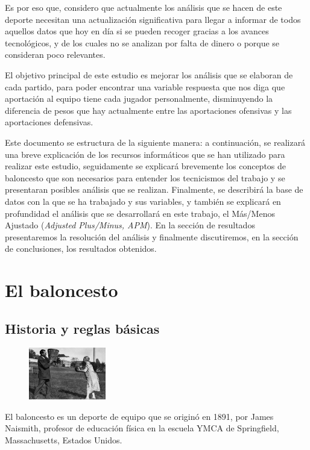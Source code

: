\documentclass[paper=a4, fontsize=9pt]{article}
\begin{document}
Es por eso que, considero que actualmente los análisis que se hacen de este deporte necesitan una actualización significativa para llegar a informar de todos aquellos datos que hoy en día si se pueden recoger gracias a los avances tecnológicos, y de los cuales no se analizan por falta de dinero o porque se consideran poco relevantes.

El objetivo principal de este estudio es mejorar los análisis que se elaboran de cada partido, para poder encontrar una variable respuesta que nos diga que aportación al equipo tiene cada jugador personalmente, disminuyendo la diferencia de pesos que hay actualmente entre las aportaciones ofensivas y las aportaciones defensivas.

Este documento se estructura de la siguiente manera: a continuación, se realizará una breve explicación de los recursos informáticos que se han utilizado para realizar este estudio, seguidamente se explicará brevemente los conceptos de baloncesto que son necesarios para entender los tecnicismos del trabajo y se presentaran posibles análisis que se realizan. Finalmente, se describirá la base de datos con la que se ha trabajado y sus variables, y también se explicará en profundidad el análisis que se desarrollará en este trabajo, el Más/Menos Ajustado (\emph{Adjusted Plus/Minus, APM}). En la sección de resultados presentaremos la resolución del análisis y finalmente discutiremos, en la sección de conclusiones, los resultados obtenidos.
\section{El baloncesto}

\subsection{Historia y reglas básicas}

\begin{figure}
\centering
\includegraphics[width=0.3\textwidth]{imagenes/historia_baloncesto.jpg}
\label{fig:hist_bskb}
\end{figure}

El baloncesto es un deporte de equipo que se originó en 1891, por James Naismith, profesor de educación física en la escuela YMCA de Springfield, Massachusetts, Estados Unidos.
\end{document}
